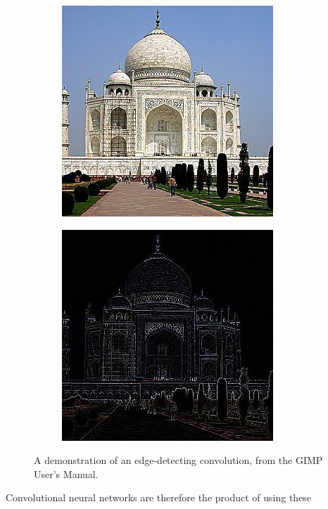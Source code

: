 \begin{figure}[!htb]
    \begin{subfigure}{0.5\textwidth}
    \centering
    \includegraphics{images/gimp_original}
    \end{subfigure}%
    \begin{subfigure}{0.5\textwidth}
    \centering
    \includegraphics{images/gimp_edgedetect}
    \end{subfigure}

\caption{A demonstration of an edge-detecting convolution, from the GIMP User's Manual. \cite{gimpconvolution}}
\label{fig:gimp_edge}
\end{figure}

Convolutional neural networks are therefore the product of using these 



